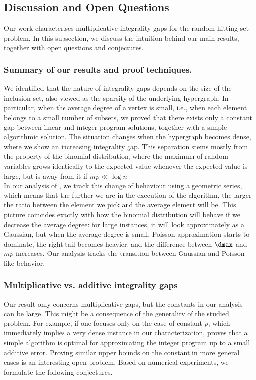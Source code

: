 \subsection{Discussion and Open Questions}\label{sec:discussion}


Our work characterises multiplicative integrality gaps for the random hitting set problem. In this subsection, we discuss the intuition behind our main results, together with open questions and conjectures.
\subsubsection{Summary of our results and proof techniques.}
We identified that the nature of integrality gaps depends on the size of the inclusion set, also viewed as the sparsity of the underlying hypergraph. In particular, when the average degree of a vertex is small, i.e., when each element belongs to a small number of subsets, we proved that there exists only a constant gap between linear and integer program solutions, together with a simple algorithmic solution. The situation changes when the hypergraph becomes dense, where we show an increasing integrality gap. This separation stems mostly from the property of the binomial distribution, where the maximum of random variables grows identically to the expected value whenever the expected value is large, but is away from it if \(mp \ll \log n\).\\
\noindent
 In our analysis of \bgreedy, we track this change of behaviour using a geometric series, which means that the further we are in the execution of the algorithm, the larger the ratio between the element we pick and the average element will be. This picture coincides exactly with how the binomial distribution will behave if we decrease the average degree: for large instances, it will look approximately as a Gaussian, but when the average degree is small, Poisson approximation starts to dominate, the right tail becomes heavier, and the difference between \(\dmax\) and \(mp\) increases. Our analysis tracks the transition between Gaussian and Poisson-like behavior.
\subsubsection{Multiplicative vs. additive integrality gaps}
Our result only concerns multiplicative gaps, but the constants in our analysis can be large. This might be a consequence of the generality of the studied problem. For example, if one focuses only on the case of constant \(p\), which immediately implies a very dense instance in our characterization, \cite{telelis2005absolute} proves that a simple algorithm is optimal for approximating the integer program up to a small additive error. Proving similar upper bounds on the constant in more general cases is an interesting open problem. Based on numerical experiments, we formulate the following conjectures.

